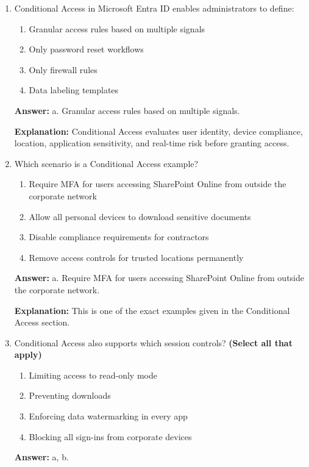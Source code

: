 \documentclass[10pt]{article}
\begin{document}
\begin{enumerate}[leftmargin=*]
\textbf{Explanation:} These mechanisms work together to make access decisions dynamic and based on current context rather than static credentials.

\item Conditional Access in Microsoft Entra ID enables administrators to define:
\begin{enumerate}[label=\alph*., leftmargin=1.5em]
\item Granular access rules based on multiple signals
\item Only password reset workflows
\item Only firewall rules
\item Data labeling templates
\end{enumerate}
\textbf{Answer:} a. Granular access rules based on multiple signals.

\textbf{Explanation:} Conditional Access evaluates user identity, device compliance, location, application sensitivity, and real-time risk before granting access.

\item Which scenario is a Conditional Access example?
\begin{enumerate}[label=\alph*., leftmargin=1.5em]
\item Require MFA for users accessing SharePoint Online from outside the corporate network
\item Allow all personal devices to download sensitive documents
\item Disable compliance requirements for contractors
\item Remove access controls for trusted locations permanently
\end{enumerate}
\textbf{Answer:} a. Require MFA for users accessing SharePoint Online from outside the corporate network.

\textbf{Explanation:} This is one of the exact examples given in the Conditional Access section.

\item Conditional Access also supports which session controls? \textbf{(Select all that apply)}
\begin{enumerate}[label=\alph*., leftmargin=1.5em]
\item Limiting access to read-only mode
\item Preventing downloads
\item Enforcing data watermarking in every app
\item Blocking all sign-ins from corporate devices
\end{enumerate}
\textbf{Answer:} a, b.


\end{enumerate}
\end{document}
